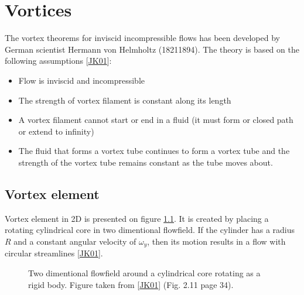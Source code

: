 \documentclass[a4paper,12pt,english]{jupyterBook}
\begin{document}
\chapter{Vortices}
\label{\detokenize{chapters/description/theory:vortices}}
\sphinxAtStartPar
The vortex theorems for inviscid incompressible flows has been developed by German scientist Hermann von Helmholtz (1821\sphinxhyphen{}1894). The theory is based on the following assumptions {[}\hyperlink{cite.chapters/bibliography:id4}{JK01}{]}:
\begin{itemize}
\item {} 
\sphinxAtStartPar
Flow is inviscid and incompressible

\item {} 
\sphinxAtStartPar
The strength of vortex filament is constant along its length

\item {} 
\sphinxAtStartPar
A vortex filament cannot start or end in a fluid (it must form or closed path or extend to infinity)

\item {} 
\sphinxAtStartPar
The fluid that forms a vortex tube continues to form a vortex tube and the strength of the vortex tube remains constant as the tube moves about.

\end{itemize}


\section{Vortex element}
\label{\detokenize{chapters/description/theory:vortex-element}}
\sphinxAtStartPar
Vortex element in 2D is presented on figure \hyperref[\detokenize{chapters/description/theory:vortex}]{\ref{\detokenize{chapters/description/theory:vortex}}}. It is created by placing a rotating cylindrical core in two dimentional flowfield. If the cylinder has a radius \(R\) and a constant angular velocity of \(\omega_y\), then its motion results in a flow with circular streamlines {[}\hyperlink{cite.chapters/bibliography:id4}{JK01}{]}.

\begin{figure}[htbp]
\centering
\capstart

\noindent{}
\caption{Two dimentional flowfield around a cylindrical core rotating as a rigid body. Figure taken from {[}\hyperlink{cite.chapters/bibliography:id4}{JK01}{]} (Fig. 2.11 page 34).}\label{\detokenize{chapters/description/theory:vortex}}\end{figure}
\end{document}
